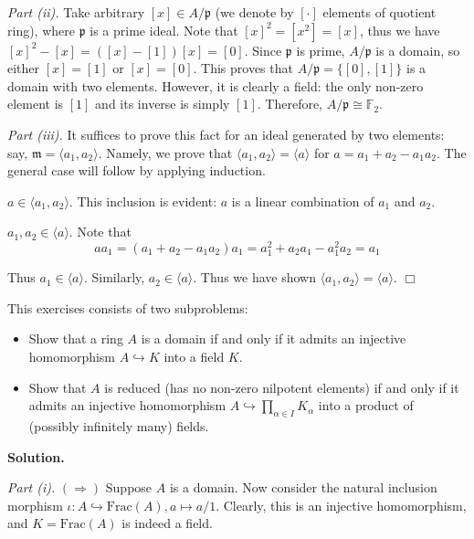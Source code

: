\documentclass{template}
\newcommand{\qedwhite}{\hfill \ensuremath{\Box}}
\begin{document}
\textit{Part (ii).} Take arbitrary $[x] \in A/\mathfrak{p}$ (we denote by
$[\cdot]$ elements of quotient ring), where $\mathfrak{p}$ is a prime ideal.
Note that $[x]^2=[x^2]=[x]$, thus we have $[x]^2-[x] = ([x]-[1])[x] = [0]$.
Since $\mathfrak{p}$ is prime, $A/\mathfrak{p}$ is a domain, so either $[x]=[1]$
or $[x]=[0]$. This proves that $A/\mathfrak{p} = \{[0],[1]\}$ is a domain with
two elements. However, it is clearly a field: the only non-zero element is $[1]$
and its inverse is simply $[1]$. Therefore, $A/\mathfrak{p} \cong \mathbb{F}_2$.

\textit{Part (iii).} It suffices to prove this fact for an ideal generated by
two elements: say, $\mathfrak{m} = \langle a_1, a_2\rangle$. Namely, we prove
that $\langle a_1, a_2 \rangle = \langle a \rangle$ for $a=a_1+a_2-a_1a_2$. The
general case will follow by applying induction. 

\textcolor{gray!80!black}{$a \in \langle a_1, a_2 \rangle$.} This inclusion is
evident: $a$ is a linear combination of $a_1$ and $a_2$.

\textcolor{gray!80!black}{$a_1,a_2 \in \langle a \rangle$.} Note that
\begin{equation*}
    aa_1 = (a_1+a_2-a_1a_2)a_1 = a_1^2 + a_2a_1 - a_1^2a_2 = a_1
\end{equation*}

Thus $a_1 \in \langle a \rangle$. Similarly, $a_2 \in \langle a \rangle$. Thus
we have shown $\langle a_1, a_2 \rangle = \langle a \rangle$. \qedwhite

\begin{problem}[Exercise 3]
    This exercises consists of two subproblems:
    \begin{itemize}
        \item[\textit{(i)}] Show that a ring $A$ is a domain if and only if it
admits an injective homomorphism $A \hookrightarrow K$ into a field $K$.
        \item[\textit{(ii)}] Show that $A$ is reduced (has no non-zero nilpotent
elements) if and only if it admits an injective homomorphism $A \hookrightarrow
\prod_{\alpha \in I}K_{\alpha}$ into a product of (possibly infinitely many)
fields.
    \end{itemize}
\end{problem}

\textbf{Solution.}

\textit{Part (i).} $(\Rightarrow)$ Suppose $A$ is a domain. Now consider the
natural inclusion morphism $\iota: A \hookrightarrow \text{Frac}(A), a \mapsto a/1$. Clearly,
this is an injective homomorphism, and $K=\text{Frac}(A)$ is indeed a field.
\end{document}
